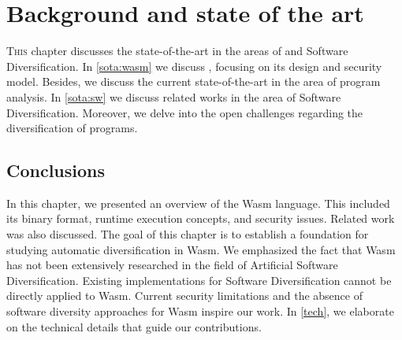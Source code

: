 \chapter{Background and state of the art}
\label{SOTA}

\lettrine[lines=3]{T}{his} chapter discusses the state-of-the-art in the areas of \Wasm and Software Diversification. 
In \autoref{sota:wasm} we discuss \Wasm, focusing on its design and security model.
Besides, we discuss the current state-of-the-art in the area of \Wasm program analysis.
In \autoref{sota:sw} we discuss related works in the area of Software Diversification.
Moreover, we delve into the open challenges regarding the diversification of \Wasm programs.






\section*{Conclusions}

In this chapter, we presented an overview of the Wasm language. 
This included its binary format, runtime execution concepts, and security issues. 
Related work was also discussed. 
The goal of this chapter is to establish a foundation for studying automatic diversification in Wasm. 
We emphasized the fact that Wasm has not been extensively researched in the field of Artificial Software Diversification. 
Existing implementations for Software Diversification cannot be directly applied to Wasm. 
Current security limitations and the absence of software diversity approaches for Wasm inspire our work. 
In \autoref{tech}, we elaborate on the technical details that guide our contributions.
